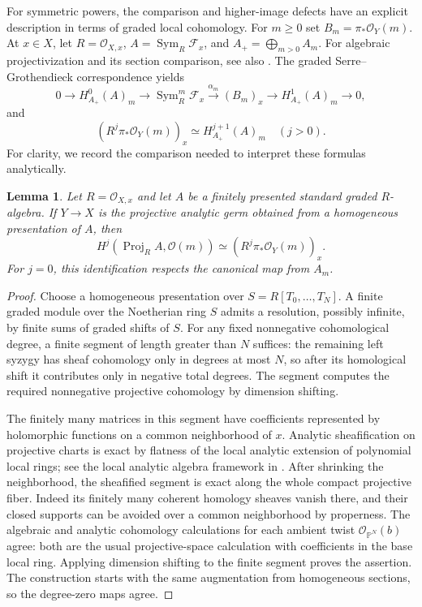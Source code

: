 \documentclass[11pt,reqno]{amsart}
\numberwithin{equation}{section}
\newtheorem{lemma}[theorem]{Lemma}
\theoremstyle{definition}
\theoremstyle{remark}
\newcommand{\OO}{\mathcal O}
\newcommand{\FF}{\mathcal F}
\newcommand{\PP}{\mathbb P}
\newcommand{\Sym}{\operatorname{Sym}}
\DeclareMathOperator{\Proj}{Proj}
\begin{document}
For symmetric powers, the comparison and higher-image defects have an explicit description in terms of graded local cohomology. For $m\geq0$ set $B_m=\pi_*\OO_Y(m)$. At $x\in X$, let $R=\OO_{X,x}$, $A=\Sym_R\FF_x$, and $A_+=\bigoplus_{m>0}A_m$. For algebraic projectivization and its section comparison, see also \cite{Stacks}. The graded Serre--Grothendieck correspondence yields
\begin{equation}\label{eq:graded}
 0\to H^0_{A_+}(A)_m\to\Sym_R^m\FF_x
 \xrightarrow{\alpha_m}(B_m)_x
 \to H^1_{A_+}(A)_m\to0,
\end{equation}
and
\begin{equation}\label{eq:highergraded}
 (R^j\pi_*\OO_Y(m))_x\simeq H^{j+1}_{A_+}(A)_m\quad(j>0).
\end{equation}
For clarity, we record the comparison needed to interpret these formulas analytically.
\begin{lemma}\label{lem:germ-comparison}
Let $R=\OO_{X,x}$ and let $A$ be a finitely presented standard graded $R$-algebra. If $Y\to X$ is the projective analytic germ obtained from a homogeneous presentation of $A$, then
\[
 H^j(\Proj_R A,\OO(m))\simeq(R^j\pi_*\OO_Y(m))_x.
\]
For $j=0$, this identification respects the canonical map from $A_m$.
\end{lemma}
\begin{proof}
Choose a homogeneous presentation over $S=R[T_0,\ldots,T_N]$. A finite graded module over the Noetherian ring $S$ admits a resolution, possibly infinite, by finite sums of graded shifts of $S$. For any fixed nonnegative cohomological degree, a finite segment of length greater than $N$ suffices: the remaining left syzygy has sheaf cohomology only in degrees at most $N$, so after its homological shift it contributes only in negative total degrees. The segment computes the required nonnegative projective cohomology by dimension shifting.

The finitely many matrices in this segment have coefficients represented by holomorphic functions on a common neighborhood of $x$. Analytic sheafification on projective charts is exact by flatness of the local analytic extension of polynomial local rings; see the local analytic algebra framework in \cite{GrauertRemmert}. After shrinking the neighborhood, the sheafified segment is exact along the whole compact projective fiber. Indeed its finitely many coherent homology sheaves vanish there, and their closed supports can be avoided over a common neighborhood by properness. The algebraic and analytic cohomology calculations for each ambient twist $\OO_{\PP^N}(b)$ agree: both are the usual projective-space calculation with coefficients in the base local ring. Applying dimension shifting to the finite segment proves the assertion. The construction starts with the same augmentation from homogeneous sections, so the degree-zero maps agree.
\end{proof}
\end{document}
